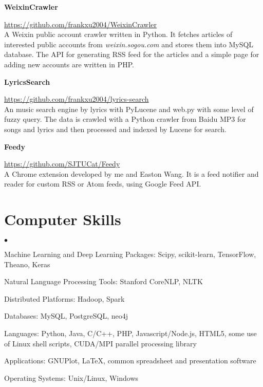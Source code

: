 \documentclass[margin,line]{res}
\newenvironment{list2}{
  \begin{list}{$\bullet$}{%
      \setlength{\itemsep}{0in}
      \setlength{\parsep}{0in} \setlength{\parskip}{0in}
      \setlength{\topsep}{0in} \setlength{\partopsep}{0in} 
      \setlength{\leftmargin}{0.2in}}}{\end{list}}
\begin{document}
\begin{resume}
{\bf WeixinCrawler}

\vspace{-.3cm}
\url{https://github.com/frankxu2004/WeixinCrawler}\\
A Weixin public account crawler written in Python. It fetches articles of interested public accounts from \textit{weixin.sogou.com} and stores them into MySQL database. The API for generating RSS feed for the articles and a simple page for adding new accounts are written in PHP.

{\bf LyricsSearch}

\vspace{-.3cm}
\url{https://github.com/frankxu2004/lyrics-search}\\
An music search engine by lyrics with PyLucene and web.py with some level of fuzzy query. The data is crawled with a Python crawler from Baidu MP3 for songs and lyrics and then processed and indexed by Lucene for search.

{\bf Feedy}

\vspace{-.3cm}
\url{https://github.com/SJTUCat/Feedy}\\
A Chrome extension developed by me and Easton Wang. It is a feed notifier and reader for custom RSS or Atom feeds, using Google Feed API.

\section{\sc Computer Skills} 
\begin{list2}
\item Machine Learning and Deep Learning Packages: Scipy, scikit-learn, TensorFlow, Theano, Keras
\item Natural Language Processing Tools: Stanford CoreNLP, NLTK
\item Distributed Platforms: Hadoop, Spark
\item Databases: MySQL, PostgreSQL, neo4j
\item Languages: Python, Java, C/C++, PHP, Javascript/Node.js, HTML5, some use of Linux shell scripts,
  CUDA/MPI parallel processing library
\item Applications: GNUPlot, \LaTeX, common spreadsheet and presentation software
\item Operating Systems:  Unix/Linux, Windows\\ 
\end{list2}

\end{resume}
\end{document}
